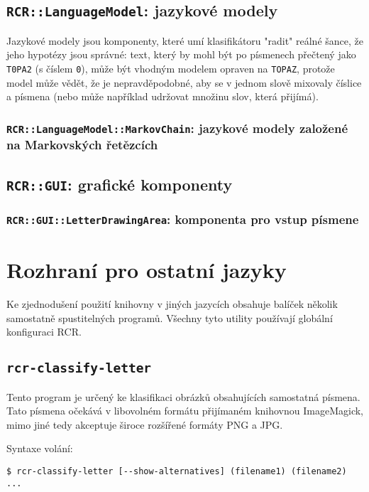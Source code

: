 \documentclass[a4paper]{article}
\begin{document}
\subsection{\texttt{RCR::LanguageModel}: jazykové modely}
Jazykové modely jsou komponenty, které umí klasifikátoru "radit"
reálné šance, že jeho hypotézy jsou správné: text,
který by mohl být po písmenech přečtený jako \texttt{T0PA2} (s číslem
\texttt{0}), může být vhodným modelem opraven na \texttt{TOPAZ}, protože
model může vědět, že je nepravděpodobné, aby se v jednom slově mixovaly
číslice a písmena (nebo může například udržovat množinu slov, která
přijímá).


\subsubsection{\texttt{RCR::LanguageModel::MarkovChain}: jazykové modely
založené na Markovských řetězcích}

\subsection{\texttt{RCR::GUI}: grafické komponenty}
\subsubsection{\texttt{RCR::GUI::LetterDrawingArea}: komponenta pro vstup
písmene}

\section{Rozhraní pro ostatní jazyky}
Ke zjednodušení použití knihovny v jiných jazycích obsahuje balíček několik
samostatně spustitelných programů. Všechny tyto utility používají globální
konfiguraci RCR.

\subsection{\texttt{rcr-classify-letter}}
Tento program je určený ke klasifikaci obrázků obsahujících samostatná písmena.
Tato písmena očekává v libovolném formátu přijímaném knihovnou ImageMagick,
mimo jiné tedy akceptuje široce rozšířené formáty PNG a JPG.

Syntaxe volání:
\begin{lstlisting}
$ rcr-classify-letter [--show-alternatives] (filename1) (filename2) ...
\end{lstlisting}
\end{document}
